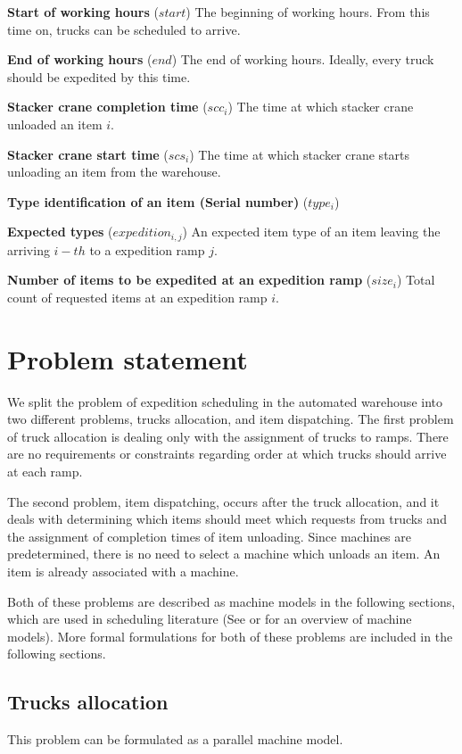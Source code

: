 \documentclass{ctuthesis}
\begin{document}
\noindent \textbf{Start of working hours} ($start$) The beginning of working hours. From this time on, trucks can be scheduled to arrive.

\noindent \textbf{End of working hours} ($end$) The end of working hours. Ideally, every truck should be expedited by this time.

\noindent \textbf{Stacker crane completion time} ($scc_i$) The time at which stacker crane unloaded an item $i$.

\noindent \textbf{Stacker crane start time} ($scs_i$) The time at which stacker crane starts unloading an item from the warehouse.

\noindent \textbf{Type identification of an item (Serial number)} ($type_i$)

\noindent \textbf{Expected types} ($expedition_{i,j}$) An expected item type of an item leaving the arriving $i-th$ to a expedition ramp $j$. 

\noindent \textbf{Number of items to be expedited at an expedition ramp} ($size_{i}$) Total count of requested items at an expedition ramp $i$. 



\chapter{Problem statement}

 We split the problem of expedition scheduling in the automated warehouse into two different problems, trucks allocation, and item dispatching. The first problem of truck allocation is dealing only with the assignment of trucks to ramps. There are no requirements or constraints regarding order at which trucks should arrive at each ramp.
 
 The second problem, item dispatching, occurs after the truck allocation, and it deals with determining which items should meet which requests from trucks and the assignment of completion times of item unloading. Since machines are predetermined, there is no need to select a machine which unloads an item. An item is already associated with a machine.
 
Both of these problems are described as machine models in the following sections, which are used in scheduling literature (See \cite{pinedo} or \cite{brucker} for an overview of machine models). More formal formulations for both of these problems are included in the following sections.
 
 \section{Trucks allocation}
 \label{subsec:truckallocation}
This problem can be formulated as a parallel machine model.
 
\end{document}
